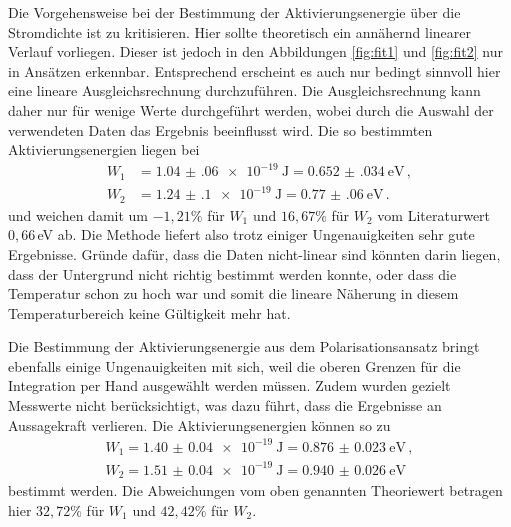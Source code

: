 Die Vorgehensweise bei der Bestimmung der Aktivierungsenergie über die Stromdichte ist zu kritisieren.
Hier sollte theoretisch ein annähernd linearer Verlauf vorliegen. Dieser ist jedoch
in den Abbildungen \ref{fig:fit1} und \ref{fig:fit2} nur in Ansätzen erkennbar.
Entsprechend erscheint es auch nur bedingt sinnvoll hier eine lineare Ausgleichsrechnung
durchzuführen. Die Ausgleichsrechnung kann daher nur für wenige Werte durchgeführt
werden, wobei durch die Auswahl der verwendeten Daten das Ergebnis beeinflusst
wird. Die so bestimmten Aktivierungsenergien liegen bei
\begin{align}
  W_1&=\SI{1.04(06)e-19}{\joule}= \SI{0.652(034)}{\eV}  \,, \\
  W_2&=\SI{1.24(10)e-19}{\joule}=\SI{0.77(06)}{\eV} \,.
\end{align}
und weichen damit um $-1{,}21\%$ für $W_1$ und $16{,}67\%$ für
$W_2$ vom Literaturwert $0{,}66\,$eV ab. Die Methode liefert also trotz einiger
Ungenauigkeiten sehr gute Ergebnisse.
Gründe dafür, dass die Daten nicht-linear sind könnten darin liegen, dass der Untergrund
nicht richtig bestimmt werden konnte, oder dass die Temperatur schon zu hoch war und somit
die lineare Näherung in diesem Temperaturbereich keine Gültigkeit mehr hat.

Die Bestimmung der Aktivierungsenergie aus dem Polarisationsansatz bringt ebenfalls
einige Ungenauigkeiten mit sich, weil die oberen Grenzen für die Integration per Hand
ausgewählt werden müssen. Zudem wurden gezielt Messwerte nicht berücksichtigt, was
dazu führt, dass die Ergebnisse an Aussagekraft verlieren. Die Aktivierungsenergien
können so zu
\begin{align*}
	W_1=\SI{1.40(4)e-19}{\joule}=\SI{0.876(23)}{\eV} \,, \\
	W_2=\SI{1.51(4)e-19}{\joule}=\SI{0.940(26)}{\eV} \,
\end{align*}
bestimmt werden. Die Abweichungen vom oben genannten Theoriewert betragen hier
$32{,}72\%$ für $W_1$ und $42{,}42\%$ für $W_2$.

